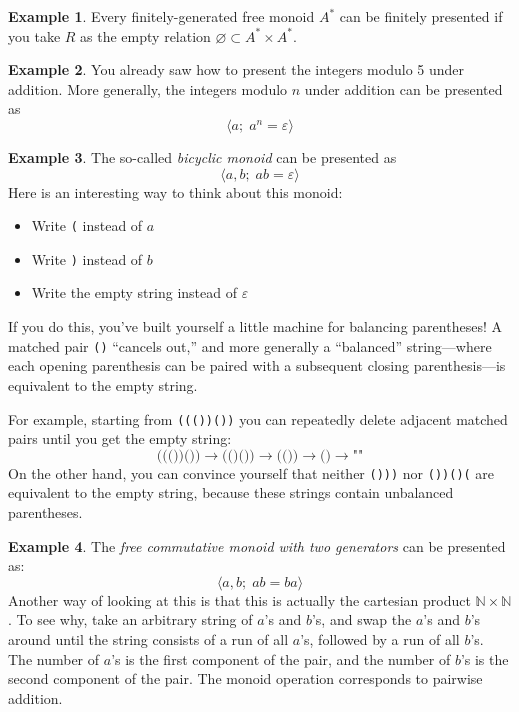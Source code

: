 \documentclass[a4paper,headsepline,bibliography=totoc,toc=flat,fleqn,twoside=semi]{scrbook}
\theoremstyle{definition}
\theoremstyle{definition}
\newtheorem{example}{Example}[chapter]
\theoremstyle{definition}
\begin{document}
\begin{example}
Every finitely-generated free monoid $A^*$ can be finitely presented if you take $R$ as the empty relation $\varnothing\subset A^*\times A^*$.
\end{example}

\begin{example}
You already saw how to present the integers modulo 5 under addition. More generally, the integers modulo $n$ under addition can be presented as
\[\langle a;\; a^n=\varepsilon \rangle\]
\end{example}

\begin{example}\label{bicyclic}
The so-called \emph{bicyclic monoid} can be presented as
\[\langle a, b;\; ab=\varepsilon\rangle\]
Here is an interesting way to think about this monoid:
\begin{itemize}
\item Write \texttt{(} instead of $a$
\item Write \texttt{)} instead of $b$
\item Write the empty string instead of $\varepsilon$
\end{itemize}
If you do this, you've built yourself a little machine for balancing parentheses! A matched pair \texttt{()} ``cancels out,'' and more generally a ``balanced'' string---where each opening parenthesis can be paired with a subsequent closing parenthesis---is equivalent to the empty string.

For example, starting from \texttt{((())())} you can repeatedly delete adjacent matched pairs until you get the empty string:
\[\texttt{((())())}\rightarrow\texttt{(()())}\rightarrow\texttt{(())}\rightarrow\texttt{()}\rightarrow\texttt{""}\]
On the other hand, you can convince yourself that neither \texttt{()))} nor \texttt{())()(} are equivalent to the empty string, because these strings contain unbalanced parentheses.
\end{example}

\begin{example}
The \emph{free commutative monoid with two generators} can be presented as:
\[\langle a, b;\; ab=ba\rangle\]
Another way of looking at this is that this is actually the cartesian product $\mathbb{N}\times\mathbb{N}$. To see why, take an arbitrary string of $a$'s and $b$'s, and swap the $a$'s and $b$'s around until the string consists of a run of all $a$'s, followed by a run of all $b$'s. The number of $a$'s is the first component of the pair, and the number of $b$'s is the second component of the pair. The monoid operation corresponds to pairwise addition.
\end{example}
\end{document}
